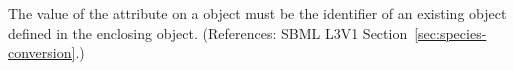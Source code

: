 The value of the attribute  on a \Species object
must be the identifier of an existing \Parameter object defined in the
enclosing \Model object.  (References: SBML L3V1
Section~\ref{sec:species-conversion}.)
